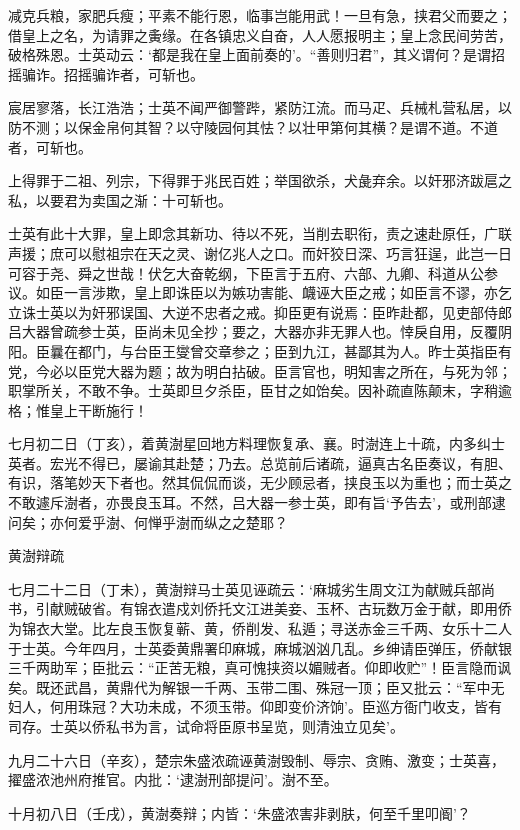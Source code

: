 \documentclass[]{article}
\begin{document}
减克兵粮，家肥兵瘦；平素不能行恩，临事岂能用武！一旦有急，挟君父而要之；借皇上之名，为请罪之夤缘。在各镇忠义自奋，人人愿报明主；皇上念民间劳苦，破格殊恩。士英动云：`都是我在皇上面前奏的'。``善则归君''，其义谓何？是谓招摇骗诈。招摇骗诈者，可斩也。

宸居寥落，长江浩浩；士英不闻严御警跸，紧防江流。而马疋、兵械札营私居，以防不测；以保金帛何其智？以守陵园何其怯？以壮甲第何其横？是谓不道。不道者，可斩也。

上得罪于二祖、列宗，下得罪于兆民百姓；举国欲杀，犬彘弃余。以奸邪济跋扈之私，以要君为卖国之渐：十可斩也。

士英有此十大罪，皇上即念其新功、待以不死，当削去职衔，责之速赴原任，广联声援；庶可以慰祖宗在天之灵、谢亿兆人之口。而奸狡日深、巧言狂逞，此岂一日可容于尧、舜之世哉！伏乞大奋乾纲，下臣言于五府、六部、九卿、科道从公参议。如臣一言涉欺，皇上即诛臣以为嫉功害能、衊诬大臣之戒；如臣言不谬，亦乞立诛士英以为奸邪误国、大逆不忠者之戒。抑臣更有说焉：臣昨赴都，见吏部侍郎吕大器曾疏参士英，臣尚未见全抄；要之，大器亦非无罪人也。悻戾自用，反覆阴阳。臣曩在都门，与台臣王燮曾交章参之；臣到九江，甚鄙其为人。昨士英指臣有党，今必以臣党大器为题；故为明白拈破。臣言官也，明知害之所在，与死为邻；职掌所关，不敢不争。士英即旦夕杀臣，臣甘之如饴矣。因补疏直陈颠末，字稍逾格；惟皇上干断施行！

七月初二日（丁亥），着黄澍星回地方料理恢复承、襄。时澍连上十疏，内多纠士英者。宏光不得已，屡谕其赴楚；乃去。总览前后诸疏，逼真古名臣奏议，有胆、有识，落笔妙天下者也。然其侃侃而谈，无少顾忌者，挟良玉以为重也；而士英之不敢遽斥澍者，亦畏良玉耳。不然，吕大器一参士英，即有旨`予告去'，或刑部逮问矣；亦何爱乎澍、何惮乎澍而纵之之楚耶？

黄澍辩疏

七月二十二日（丁未），黄澍辩马士英见诬疏云：`麻城劣生周文江为献贼兵部尚书，引献贼破省。有锦衣遣戍刘侨托文江进美妾、玉杯、古玩数万金于献，即用侨为锦衣大堂。比左良玉恢复蕲、黄，侨削发、私遁；寻送赤金三千两、女乐十二人于士英。今年四月，士英委黄鼎署印麻城，麻城汹汹几乱。乡绅请臣弹压，侨献银三千两助军；臣批云：``正苦无粮，真可愧挟资以媚贼者。仰即收贮''！臣言隐而讽矣。既还武昌，黄鼎代为解银一千两、玉带二围、殊冠一顶；臣又批云：``军中无妇人，何用珠冠？大功未成，不须玉带。仰即变价济饷'。臣巡方衙门收支，皆有司存。士英以侨私书为言，试命将臣原书呈览，则清浊立见矣'。

九月二十六日（辛亥），楚宗朱盛浓疏诬黄澍毁制、辱宗、贪贿、激变；士英喜，擢盛浓池州府推官。内批：`逮澍刑部提问'。澍不至。

十月初八日（壬戌），黄澍奏辩；内皆：`朱盛浓害非剥肤，何至千里叩阍'？
\end{document}
